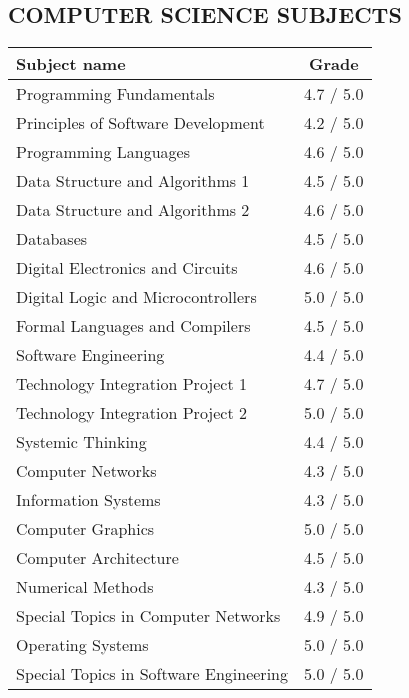 \documentclass[margin, 10pt]{res} %
\begin{document}
\begin{resume}


\section{COMPUTER SCIENCE SUBJECTS}

\begin{center}
\begin{tabular}{| l | c |}
  \hline
  \textbf{Subject name} & \textbf{Grade}\\ \hline
  Programming Fundamentals & 4.7 / 5.0\\ \hline
  Principles of Software Development & 4.2 / 5.0\\ \hline
  Programming Languages & 4.6 / 5.0\\ \hline
  Data Structure and Algorithms 1 & 4.5 / 5.0\\ \hline
  Data Structure and Algorithms 2 & 4.6 / 5.0\\ \hline
  Databases & 4.5 / 5.0\\ \hline
  Digital Electronics and Circuits & 4.6 / 5.0\\ \hline
  Digital Logic and Microcontrollers & 5.0 / 5.0\\ \hline
  Formal Languages and Compilers & 4.5 / 5.0\\ \hline
  Software Engineering & 4.4 / 5.0\\ \hline
  Technology Integration Project 1 & 4.7 / 5.0\\ \hline
  Technology Integration Project 2 & 5.0 / 5.0\\ \hline
  Systemic Thinking & 4.4 / 5.0 \\ \hline
  Computer Networks & 4.3 / 5.0\\ \hline
  Information Systems & 4.3 / 5.0\\ \hline
  Computer Graphics & 5.0 / 5.0 \\ \hline
  Computer Architecture & 4.5 / 5.0 \\ \hline
  Numerical Methods & 4.3 / 5.0 \\ \hline
  Special Topics in Computer Networks & 4.9 / 5.0 \\ \hline
  Operating Systems & 5.0 / 5.0 \\ \hline
  Special Topics in Software Engineering & 5.0 / 5.0 \\ \hline
\end{tabular}
\end{center}


\end{resume}
\end{document}
